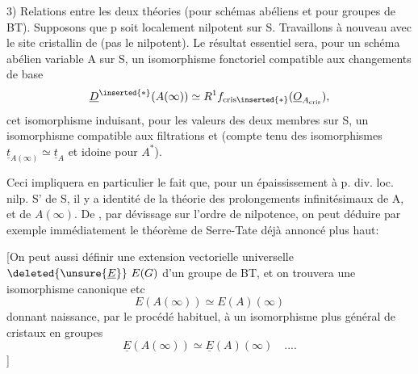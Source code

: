 3) Relations entre les deux théories (pour schémas abéliens et pour  groupes de BT). Supposons que p soit localement nilpotent sur S. Travaillons  à nouveau avec le site cristallin de  (pas le nilpotent). Le résultat essentiel sera, pour un schéma abélien variable A sur S, un isomorphisme fonctoriel compatible aux changements de base
\[
\underline{D}^{\inserted{*}}(A(\infty))\simeq R^{1}f_{\mathrm{cris}\inserted{*}}(\underline{O}_{A_{\mathrm{cris}}}),
\]
cet isomorphisme induisant, pour les valeurs des deux membres sur S, un isomorphisme compatible aux filtrations et (compte tenu des isomorphismes $\underline{t}_{A(\infty)}\simeq\underline{t}_A$ et idoine pour $A^{*}$).

Ceci impliquera en particulier le fait que, pour un  épaississement à p. div. loc. nilp.  S' de S, il y a identité de la théorie des prolongements infinitésimaux de A, et de $A(\infty)$. De , par dévissage sur l'ordre de nilpotence, on peut déduire par exemple immédiatement le théorème de Serre-Tate déjà annoncé plus haut:

[On peut aussi définir une extension vectorielle universelle $\deleted{\unsure{\underline{E}}}\ E(G)$ d'un groupe de BT, et on trouvera une isomorphisme canonique etc
\[
E(A(\infty))\simeq E(A)(\infty)
\]
donnant naissance, par le procédé habituel, à un isomorphisme plus général de cristaux en groupes
\[
\underline{E}(A(\infty))\simeq\underline{E}(A)(\infty)\quad ....
\]
]



